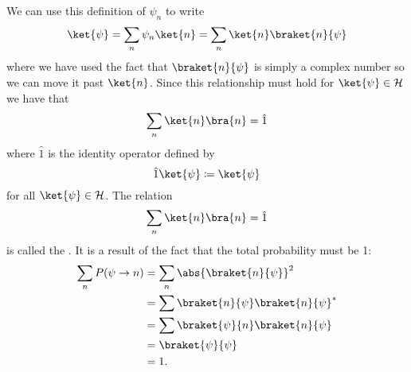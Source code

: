 \documentclass[fleqn]{NotesClass}
\newcommand*{\hilbert}{\mathcal{H}}
\newcommand*{\idop}{\hat{1}}
\begin{document}
    We can use this definition of \(\psi_n\) to write
    \begin{equation}
        \ket{\psi} = \sum_n \psi_n\ket{n} = \sum_n \ket{n}\braket{n}{\psi}
    \end{equation}
    where we have used the fact that \(\braket{n}{\psi}\) is simply a complex number so we can move it past \(\ket{n}\).
    Since this relationship must hold for \(\ket{\psi}\in\hilbert\) we have that
    \begin{equation}
        \sum_n \ket{n}\bra{n} = \idop
    \end{equation}
    where \(\idop\) is the identity operator defined by
    \begin{equation}
        \idop\ket{\psi} \coloneqq \ket{\psi}
    \end{equation}
    for all \(\ket{\psi}\in\hilbert\).
    The relation
    \begin{equation}
        \sum_n\ket{n}\bra{n} = \idop
    \end{equation}
    is called the .
    It is a result of the fact that the total probability must be 1:
    \begin{align}
        \sum_n P(\psi \to n) &= \sum_n \abs{\braket{n}{\psi}}^2\\
        &= \sum \braket{n}{\psi}\braket{n}{\psi}^*\\
        &= \sum \braket{\psi}{n}\braket{n}{\psi}\\
        &= \braket{\psi}{\psi}\\
        &= 1.
    \end{align}
    
\end{document}
